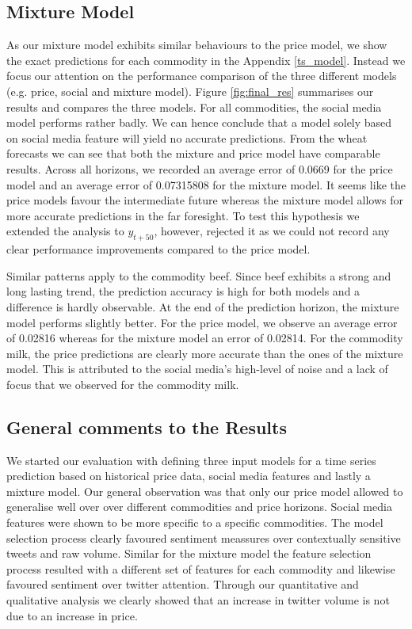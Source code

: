 \subsection{Mixture Model}
\label{final_result}


As our mixture model exhibits similar behaviours to the price model, we show the exact predictions for each commodity in the Appendix \ref{ts_model}. Instead we focus our attention on the performance comparison of the three different models (e.g. price, social and mixture model). Figure \ref{fig:final_res} summarises our results and compares the three models. For all commodities, the social media model performs rather badly. We can hence conclude that a model solely based on social media feature will yield no accurate predictions.  From the wheat forecasts we can see that both the mixture and price model have comparable results. Across all horizons, we recorded an average error of 0.0669 for the price model and an average error of 0.07315808 for the mixture model. It seems like the price models favour the intermediate future whereas the mixture model allows for more accurate predictions in the far foresight. To test this hypothesis we extended the analysis to $y_{t+50}$, however, rejected it as we could not record any clear performance improvements compared to the price model.  

Similar patterns apply to the commodity beef. Since beef exhibits a strong and long lasting trend, the prediction accuracy is high for both models and a difference is hardly observable. At the end of the prediction horizon, the mixture model performs slightly better. For the price model, we observe an average error of 0.02816 whereas for the mixture model an error of 0.02814. For the commodity milk, the price predictions are clearly more accurate than the ones of the mixture model. This is attributed to the social media's high-level of noise and a lack of focus that we observed for the commodity milk.  

\subsection{General comments to the Results}


We started our evaluation with defining three input models for a time series prediction based on historical price data, social media features and lastly a mixture model. Our general observation was that only our price model allowed to generalise well over over different commodities  and price horizons. Social media features were shown to be more specific to a specific commodities. The model selection process clearly favoured sentiment meassures over contextually sensitive tweets and raw volume. Similar for the mixture model the feature selection process resulted with a different set of features for each commodity and likewise favoured sentiment over twitter attention. Through our quantitative and qualitative analysis we clearly showed that an increase in twitter volume is not due to an increase in price. 

